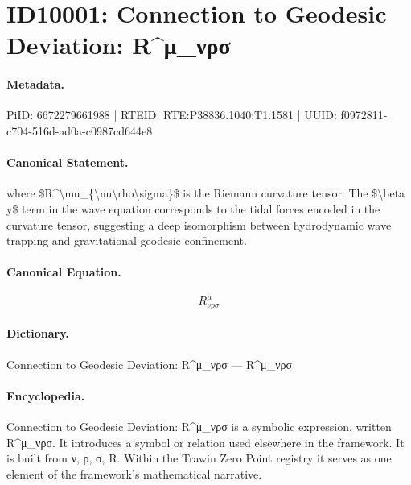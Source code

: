 \section*{ID10001: Connection to Geodesic Deviation: R\textasciicircum{}μ\_νρσ}
\paragraph{Metadata.}
PiID: 6672279661988 | RTEID: RTE:P38836.1040:T1.1581 | UUID: f0972811-c704-516d-ad0a-c0987cd644e8

\paragraph{Canonical Statement.}
where \$R\textasciicircum{}\textbackslash{}mu\_\{\textbackslash{}nu\textbackslash{}rho\textbackslash{}sigma\}\$ is the Riemann curvature tensor. The \$\textbackslash{}beta y\$ term in the wave equation corresponds to the tidal forces encoded in the curvature tensor, suggesting a deep isomorphism between hydrodynamic wave trapping and gravitational geodesic confinement.

\paragraph{Canonical Equation.}
\[
R^\mu_{\nu\rho\sigma}
\]

\paragraph{Dictionary.}
Connection to Geodesic Deviation: R\textasciicircum{}μ\_νρσ — R\textasciicircum{}μ\_νρσ

\paragraph{Encyclopedia.}
Connection to Geodesic Deviation: R\textasciicircum{}μ\_νρσ is a symbolic expression, written R\textasciicircum{}μ\_νρσ. It introduces a symbol or relation used elsewhere in the framework. It is built from ν, ρ, σ, R. Within the Trawin Zero Point registry it serves as one element of the framework's mathematical narrative.
